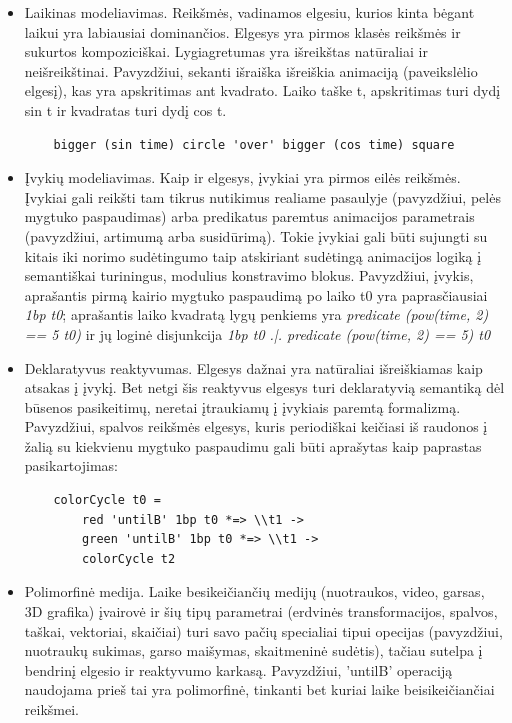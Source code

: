 \begin{itemize}

	\item Laikinas modeliavimas. Reikšmės, vadinamos elgesiu, kurios kinta bėgant laikui yra labiausiai dominančios. Elgesys yra pirmos klasės reikšmės ir sukurtos kompoziciškai. Lygiagretumas yra išreikštas natūraliai ir neišreikštinai. Pavyzdžiui, sekanti išraiška išreiškia animaciją (paveikslėlio elgesį), kas yra apskritimas ant kvadrato. Laiko taške t, apskritimas turi dydį sin t ir kvadratas turi dydį cos t.

\begin{lstlisting}
	bigger (sin time) circle 'over' bigger (cos time) square
\end{lstlisting}

	\item Įvykių modeliavimas. Kaip ir elgesys, įvykiai yra pirmos eilės reikšmės. Įvykiai gali reikšti tam tikrus nutikimus realiame pasaulyje (pavyzdžiui, pelės mygtuko paspaudimas) arba predikatus paremtus animacijos parametrais (pavyzdžiui, artimumą arba susidūrimą). Tokie įvykiai gali būti sujungti su kitais iki norimo sudėtingumo taip atskiriant sudėtingą animacijos logiką į semantiškai turiningus, modulius konstravimo blokus. Pavyzdžiui, įvykis, aprašantis pirmą kairio mygtuko paspaudimą po laiko t0 yra paprasčiausiai \textit{1bp t0}; aprašantis laiko kvadratą lygų penkiems yra \textit{predicate (pow(time, 2) == 5 t0)} ir jų loginė disjunkcija \textit{1bp t0 .|. predicate (pow(time, 2) == 5) t0}

	\item Deklaratyvus reaktyvumas. Elgesys dažnai yra natūraliai išreiškiamas kaip atsakas į įvykį. Bet netgi šis reaktyvus elgesys turi deklaratyvią semantiką dėl būsenos pasikeitimų, neretai įtraukiamų į įvykiais paremtą formalizmą. Pavyzdžiui, spalvos reikšmės elgesys, kuris periodiškai keičiasi iš raudonos į žalią su kiekvienu mygtuko paspaudimu gali būti aprašytas kaip paprastas pasikartojimas:

\begin{lstlisting}
	colorCycle t0 =
		red 'untilB' 1bp t0 *=> \\t1 ->
		green 'untilB' 1bp t0 *=> \\t1 ->
		colorCycle t2
\end{lstlisting}

	\item Polimorfinė medija. Laike besikeičiančių medijų (nuotraukos, video, garsas, 3D grafika) įvairovė ir šių tipų parametrai (erdvinės transformacijos, spalvos, taškai, vektoriai, skaičiai) turi savo pačių specialiai tipui opecijas (pavyzdžiui, nuotraukų sukimas, garso maišymas, skaitmeninė sudėtis), tačiau sutelpa į bendrinį elgesio ir reaktyvumo karkasą. Pavyzdžiui, 'untilB' operaciją naudojama prieš tai yra polimorfinė, tinkanti bet kuriai laike beisikeičiančiai reikšmei.

\end{itemize}


